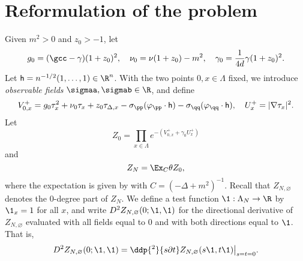 
\section{Reformulation of the problem}

Given $m^2>0$ and $z_0 >-1$, let
\begin{equation}
\label{e:gg0}
g_0 = (\gcc - \gamma) (1 + z_0)^2,
	\quad
\nu_0 = \nu (1 + z_0) - m^2,
	\quad
\gamma_0 = \frac{1}{4d} \gamma (1 + z_0)^2.
\end{equation}
Let ${\sf h} = n^{-1/2}(1, \ldots, 1) \in \R^n$.
With the two points $0,x\in \Lambda$ fixed,
we introduce \emph{observable fields} $\sigmaa, \sigmab \in \R$, and define
\begin{equation}
\label{e:V0def}
	V^+_{0,x}
	= g_0\tau_x^2 + \nu_0 \tau_x + z_0 \tau_{\Delta,x} -
	\sigma_\pp (\varphi_{\pp} \cdot {\sf h})
	- \sigma_\qq (\varphi_{\qq} \cdot {\sf h}),
	\quad
	U^+_x = |\nabla \tau_x|^2.
\end{equation}
Let
\begin{equation}
\label{e:Z0def}
Z_0 = \prod_{x\in \Lambda} e^{-(V^+_{0,x} + \gamma_0 U^+_x)}
\end{equation}
and
\begin{equation}
\label{e:ZNdef}
Z_N = \Ex_C \theta Z_0,
\end{equation}
where the expectation is given by  with $C = (-\Delta + m^2)^{-1}$.
Recall that $Z_{N,\varnothing}$ denotes the $0$-degree part of $Z_N$.
We define a test function $\1: \Lambda_N \to \R$ by $\1_x=1$ for all $x$,
and write $D^2 Z_{N,\varnothing}(0; \1, \1)$ for the directional derivative of
$Z_{N,\varnothing}$ evaluated with all fields equal to $0$ and
with both directions equal to $\1$.
That is,
\begin{equation}
D^2 Z_{N,\varnothing}(0; \1, \1)
  =
\ddp{^2}{s\partial t} Z_{N,\varnothing}(s \1, t\1)\big|_{s=t=0}.
\end{equation}

